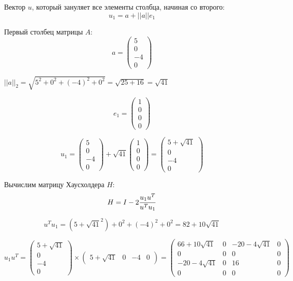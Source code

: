 \documentclass[a4paper,14pt]{article}
\begin{document}
Вектор $u$, который зануляет все элементы столбца, начиная со второго:
$$
u_1 = a + ||a||e_1
$$

Первый столбец матрицы $A$:
$$
a = \begin{pmatrix}
5 \\
0 \\
-4 \\
0 
\end{pmatrix}
$$

$||a||_2 = \sqrt{5^2 + 0^2 + (-4)^2 + 0^2} = \sqrt{25+16} = \sqrt{41}$

$$
e_1 = \begin{pmatrix}
    1 \\
    0 \\
    0 \\
    0
\end{pmatrix}
$$

$$
u_1 = \begin{pmatrix}
        5 \\
        0 \\
        -4 \\
        0 
    \end{pmatrix}
    + 
    \sqrt{41}\begin{pmatrix}
        1 \\
        0 \\
        0 \\
        0
    \end{pmatrix}
    =
    \begin{pmatrix}
        5 + \sqrt{41} \\
        0 \\
        -4 \\
        0
    \end{pmatrix}
$$

Вычислим матрицу Хаусхолдера $H$:
$$
H = I - 2{{u_1u^T}\over{u^Tu_1}}
$$

$$
u^Tu_1 = (5 + \sqrt{41}^2) + 0^2 + (-4)^2 + 0^2 = 82 + 10\sqrt{41}
$$

$$
u_1u^T = \begin{pmatrix}
            5 + \sqrt{41} \\
            0 \\
            -4 \\
            0
        \end{pmatrix}
        \times
        \begin{pmatrix}
            5 + \sqrt{41} & 0 & -4 & 0
        \end{pmatrix}
        =
        \begin{pmatrix}
            66 + 10\sqrt{41} & 0 & -20 - 4\sqrt{41} & 0 \\
            0                & 0 & 0                & 0 \\
            -20 - 4\sqrt{41} & 0 & 16               & 0 \\
            0                & 0 & 0                & 0
        \end{pmatrix}
$$
\end{document}
